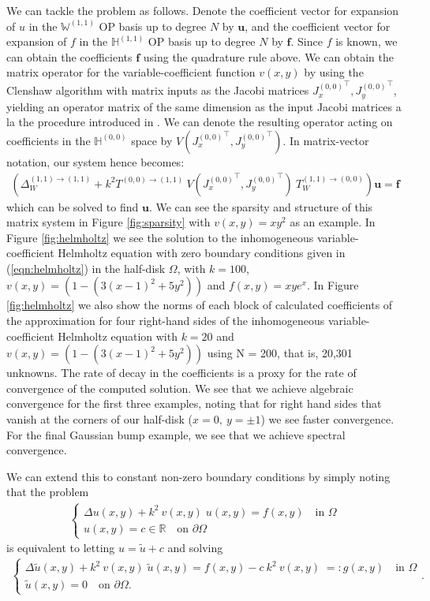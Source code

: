 \documentclass[11pt, oneside]{article}   	%
\newcommand{\R}{\mathbb{R}}
\newcommand{\hdop}{H}
\newcommand{\bighdopii}{{\mathbb{\hdop}^{(1,1)}}}
\newcommand{\bighdopoo}{{\mathbb{\hdop}^{(0,0)}}}
\newcommand{\laplacewii}{\Delta_W^{(1,1)\to(1,1)}}
\newcommand{\bigWii}{{\mathbb{W}^{(1,1)}}}
\begin{document}
We can tackle the problem as follows. Denote the coefficient vector for expansion of $u$ in the $\bigWii$ OP basis up to degree $N$ by $\mathbf{u}$, and the coefficient vector for expansion of $f$ in the $\bighdopii$ OP basis up to degree $N$ by $\mathbf{f}$. Since $f$ is known, we can obtain  the coefficients $\mathbf{f}$ using the quadrature rule above. We can obtain the matrix operator for the variable-coefficient function $v(x,y)$ by using the Clenshaw algorithm with matrix inputs as the Jacobi matrices ${J_x^{(0,0)}}^\top, {J_y^{(0,0)}}^\top$, yielding an operator matrix of the same dimension as the input Jacobi matrices a la the procedure introduced in \cite{olver2019triangle}. We can denote the resulting operator acting on coefficients in the $\bighdopoo$ space by $V({J_x^{(0,0)}}^\top, {J_y^{(0,0)}}^\top)$. In matrix-vector notation, our system hence becomes:
\begin{align*}
    (\laplacewii + k^2 T^{(0,0)\to(1,1)} \: V({J_x^{(0,0)}}^\top, {J_y^{(0,0)}}^\top) \: T_W^{(1,1)\to(0,0)}) \mathbf{u} = \mathbf{f}
\end{align*}
which can be solved to find $\mathbf{u}$. We can see the sparsity and structure of this matrix system in Figure \ref{fig:sparsity} with $v(x,y) = xy^2$ as an example. In Figure \ref{fig:helmholtz} we see the solution to the inhomogeneous variable-coefficient Helmholtz equation with zero boundary conditions given in (\ref{eqn:helmholtz}) in the half-disk $\Omega$, with $k=100$, $v(x,y) = (1 - (3(x-1)^2 + 5y^2))$ and $f(x,y) = xy e^x$. In Figure \ref{fig:helmholtz} we also show the norms of each block of calculated coefficients of the approximation for four right-hand sides of the inhomogeneous variable-coefficient Helmholtz equation with $k=20$ and $v(x,y) = (1 - (3(x-1)^2 + 5y^2))$ using N = 200, that is, 20,301 unknowns. The rate of decay in the coefficients is a proxy for the rate of convergence of the computed solution. We see that we achieve algebraic convergence for the first three examples, noting that for right hand sides that vanish at the corners of our half-disk ($x=0, \: y = \pm 1$) we see faster convergence. For the final Gaussian bump example, we see that we achieve spectral convergence.

We can extend this to constant non-zero boundary conditions by simply noting that the problem 
\begin{align*}
	\begin{cases}
    		\Delta u(x,y) + k^2 \: v(x,y) \; u(x,y) = f(x,y) \quad \text{in } \Omega \\
		u(x,y) = c \in \R \quad \text{on } \partial \Omega
	\end{cases}
\end{align*}
is equivalent to letting $u = \tilde{u} + c$ and solving
\begin{align*}
	\begin{cases}
    		\Delta \tilde{u}(x,y) + k^2 \: v(x,y) \; \tilde{u}(x,y) = f(x,y) - c \: k^2 \: v(x,y) \; =: g(x,y)  \quad \text{in } \Omega \\
		\tilde{u}(x,y) = 0 \quad \text{on } \partial \Omega.
	\end{cases}.
\end{align*}
\end{document}

